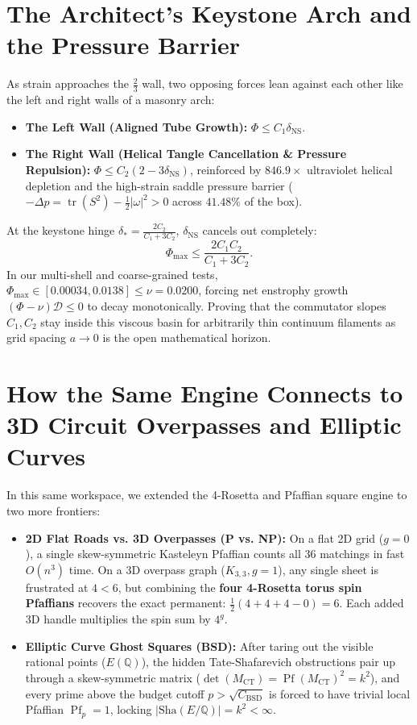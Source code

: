 \documentclass[11pt,a4paper]{article}
\providecommand{\Sha}{\mathrm{Sha}}
\theoremstyle{definition}
\begin{document}
\section{The Architect's Keystone Arch and the Pressure Barrier}
As strain approaches the $\frac{2}{3}$ wall, two opposing forces lean against each other like the left and right walls of a masonry arch:
\begin{itemize}
  \item \textbf{The Left Wall (Aligned Tube Growth):} $\Phi \le C_1 \delta_{\mathrm{NS}}$.
  \item \textbf{The Right Wall (Helical Tangle Cancellation \& Pressure Repulsion):} $\Phi \le C_2(2 - 3\delta_{\mathrm{NS}})$, reinforced by $846.9\times$ ultraviolet helical depletion and the high-strain saddle pressure barrier ($-\Delta p = \operatorname{tr}(S^2) - \frac{1}{2}|\omega|^2 > 0$ across $41.48\%$ of the box).
\end{itemize}
At the keystone hinge $\delta_* = \frac{2C_2}{C_1 + 3C_2}$, $\delta_{\mathrm{NS}}$ cancels out completely:
\begin{equation}
\Phi_{\max} \le \frac{2 C_1 C_2}{C_1 + 3 C_2}.
\end{equation}
In our multi-shell and coarse-grained tests, $\Phi_{\max} \in [0.00034, 0.0138] \le \nu = 0.0200$, forcing net enstrophy growth $(\Phi - \nu)\mathcal{D} \le 0$ to decay monotonically. Proving that the commutator slopes $C_1, C_2$ stay inside this viscous basin for arbitrarily thin continuum filaments as grid spacing $a \to 0$ is the open mathematical horizon.

\section{How the Same Engine Connects to 3D Circuit Overpasses and Elliptic Curves}
In this same workspace, we extended the 4-Rosetta and Pfaffian square engine to two more frontiers:
\begin{itemize}
  \item \textbf{2D Flat Roads vs. 3D Overpasses (P vs. NP):} On a flat 2D grid ($g = 0$), a single skew-symmetric Kasteleyn Pfaffian counts all $36$ matchings in fast $O(n^3)$ time. On a 3D overpass graph ($K_{3,3}, g = 1$), any single sheet is frustrated at $4 < 6$, but combining the \textbf{four 4-Rosetta torus spin Pfaffians} recovers the exact permanent: $\frac{1}{2}(4 + 4 + 4 - 0) = 6$. Each added 3D handle multiplies the spin sum by $4^g$.
  \item \textbf{Elliptic Curve Ghost Squares (BSD):} After taring out the visible rational points ($E(\mathbb{Q})$), the hidden Tate-Shafarevich obstructions pair up through a skew-symmetric matrix ($\det(M_{\mathrm{CT}}) = \operatorname{Pf}(M_{\mathrm{CT}})^2 = k^2$), and every prime above the budget cutoff $p > \sqrt{C_{\mathrm{BSD}}}$ is forced to have trivial local Pfaffian $\operatorname{Pf}_p = 1$, locking $|\Sha(E/\mathbb{Q})| = k^2 < \infty$.
\end{itemize}
\end{document}
